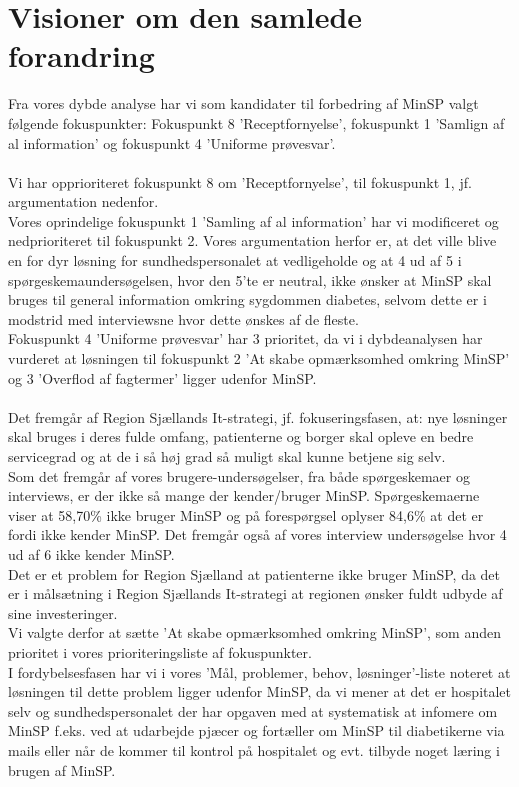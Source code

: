 \section{Visioner om den samlede forandring}
Fra vores dybde analyse har vi som kandidater til forbedring af MinSP valgt følgende fokuspunkter: Fokuspunkt 8 'Receptfornyelse', fokuspunkt 1 'Samlign af al information' og fokuspunkt 4 'Uniforme prøvesvar'.
\\\\
Vi har opprioriteret fokuspunkt 8 om 'Receptfornyelse', til fokuspunkt 1, jf. argumentation nedenfor.\\
Vores oprindelige fokuspunkt 1 'Samling af al information' har vi modificeret og nedprioriteret til fokuspunkt 2. Vores argumentation herfor er, at det ville blive en for dyr løsning for sundhedspersonalet at vedligeholde og at 4 ud af 5 i spørgeskemaundersøgelsen, hvor den 5'te er neutral, ikke ønsker at MinSP skal bruges til general information omkring sygdommen diabetes, selvom dette er i modstrid med interviewsne hvor dette ønskes af de fleste.\\
Fokuspunkt 4 'Uniforme prøvesvar' har 3 prioritet, da vi i dybdeanalysen har vurderet at løsningen til fokuspunkt 2 'At skabe opmærksomhed omkring MinSP' og 3 'Overflod af fagtermer' ligger udenfor MinSP.
\\\\
Det fremgår af Region Sjællands It-strategi, jf. fokuseringsfasen, at: nye løsninger skal bruges i deres fulde omfang, patienterne og borger skal opleve en bedre servicegrad og at de i så høj grad så muligt skal kunne betjene sig selv.\\
Som det fremgår af vores brugere-undersøgelser, fra både spørgeskemaer og interviews, er der ikke så mange der kender/bruger MinSP. Spørgeskemaerne viser at 58,70\% ikke bruger MinSP og på forespørgsel oplyser 84,6\% at det er fordi ikke kender MinSP. Det fremgår også af vores interview undersøgelse hvor 4 ud af 6 ikke kender MinSP.\\
Det er et problem for Region Sjælland at patienterne ikke bruger MinSP, da det er i målsætning i Region Sjællands It-strategi at regionen ønsker fuldt udbyde af sine investeringer. \\
Vi valgte derfor at sætte 'At skabe opmærksomhed omkring MinSP', som anden prioritet i vores prioriteringsliste af fokuspunkter. \\
I fordybelsesfasen har vi i vores 'Mål, problemer, behov, løsninger'-liste noteret at løsningen til dette problem ligger udenfor MinSP, da vi mener at det er hospitalet selv og sundhedspersonalet der har opgaven med at systematisk at infomere om MinSP f.eks. ved at udarbejde pjæcer og fortæller om MinSP til diabetikerne via mails eller når de kommer til kontrol på hospitalet og evt. tilbyde noget læring i brugen af MinSP.\\
